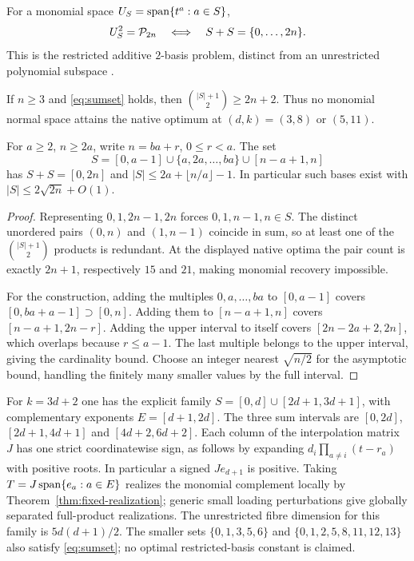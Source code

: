 For a monomial space $U_S=\operatorname{span}\{t^a:a\in S\}$,
\begin{equation}\label{eq:sumset}
 U_S^2=\mathcal P_{2n}\quad\Longleftrightarrow\quad S+S=\{0,\ldots,2n\}.
\end{equation}
This is the restricted additive $2$-basis problem, distinct from an unrestricted polynomial subspace \cite{Yu,Kohonen14,Kohonen17}.
\begin{proposition}\label{prop:monomial}
If $n\ge3$ and \eqref{eq:sumset} holds, then $\binom{|S|+1}{2}\ge2n+2$. Thus no monomial normal space attains the native optimum at $(d,k)=(3,8)$ or $(5,11)$.

For $a\ge2$, $n\ge2a$, write $n=ba+r$, $0\le r<a$. The set
\[
 S=[0,a-1]\cup\{a,2a,\ldots,ba\}\cup[n-a+1,n]
\]
has $S+S=[0,2n]$ and $|S|\le2a+\lfloor n/a\rfloor-1$. In particular such bases exist with $|S|\le2\sqrt{2n}+O(1)$.
\end{proposition}
\begin{proof}
Representing $0,1,2n-1,2n$ forces $0,1,n-1,n\in S$. The distinct unordered pairs $(0,n)$ and $(1,n-1)$ coincide in sum, so at least one of the $\binom{|S|+1}{2}$ products is redundant. At the displayed native optima the pair count is exactly $2n+1$, respectively $15$ and $21$, making monomial recovery impossible.

For the construction, adding the multiples $0,a,\ldots,ba$ to $[0,a-1]$ covers $[0,ba+a-1]\supset[0,n]$. Adding them to $[n-a+1,n]$ covers $[n-a+1,2n-r]$. Adding the upper interval to itself covers $[2n-2a+2,2n]$, which overlaps because $r\le a-1$. The last multiple belongs to the upper interval, giving the cardinality bound. Choose an integer nearest $\sqrt{n/2}$ for the asymptotic bound, handling the finitely many smaller values by the full interval.
\end{proof}
For $k=3d+2$ one has the explicit family $S=[0,d]\cup[2d+1,3d+1]$, with complementary exponents $E=[d+1,2d]$. The three sum intervals are $[0,2d]$, $[2d+1,4d+1]$ and $[4d+2,6d+2]$. Each column of the interpolation matrix $J$ has one strict coordinatewise sign, as follows by expanding $d_i\prod_{a\ne i}(t-r_a)$ with positive roots. In particular a signed $Je_{d+1}$ is positive. Taking $T=J\operatorname{span}\{e_a:a\in E\}$ realizes the monomial complement locally by Theorem~\ref{thm:fixed-realization}; generic small loading perturbations give globally separated full-product realizations. The unrestricted fibre dimension for this family is $5d(d+1)/2$. The smaller sets $\{0,1,3,5,6\}$ and $\{0,1,2,5,8,11,12,13\}$ also satisfy \eqref{eq:sumset}; no optimal restricted-basis constant is claimed.

